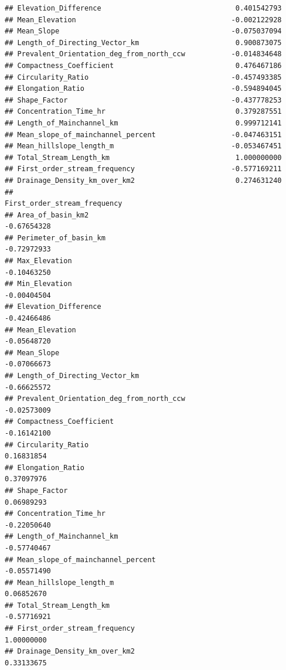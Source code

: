 \documentclass[11pt,]{article}
\begin{document}
\begin{verbatim}
## Elevation_Difference                                0.401542793
## Mean_Elevation                                     -0.002122928
## Mean_Slope                                         -0.075037094
## Length_of_Directing_Vector_km                       0.900873075
## Prevalent_Orientation_deg_from_north_ccw           -0.014834648
## Compactness_Coefficient                             0.476467186
## Circularity_Ratio                                  -0.457493385
## Elongation_Ratio                                   -0.594894045
## Shape_Factor                                       -0.437778253
## Concentration_Time_hr                               0.379287551
## Length_of_Mainchannel_km                            0.999712141
## Mean_slope_of_mainchannel_percent                  -0.047463151
## Mean_hillslope_length_m                            -0.053467451
## Total_Stream_Length_km                              1.000000000
## First_order_stream_frequency                       -0.577169211
## Drainage_Density_km_over_km2                        0.274631240
##                                          First_order_stream_frequency
## Area_of_basin_km2                                         -0.67654328
## Perimeter_of_basin_km                                     -0.72972933
## Max_Elevation                                             -0.10463250
## Min_Elevation                                             -0.00404504
## Elevation_Difference                                      -0.42466486
## Mean_Elevation                                            -0.05648720
## Mean_Slope                                                -0.07066673
## Length_of_Directing_Vector_km                             -0.66625572
## Prevalent_Orientation_deg_from_north_ccw                  -0.02573009
## Compactness_Coefficient                                   -0.16142100
## Circularity_Ratio                                          0.16831854
## Elongation_Ratio                                           0.37097976
## Shape_Factor                                               0.06989293
## Concentration_Time_hr                                     -0.22050640
## Length_of_Mainchannel_km                                  -0.57740467
## Mean_slope_of_mainchannel_percent                         -0.05571490
## Mean_hillslope_length_m                                    0.06852670
## Total_Stream_Length_km                                    -0.57716921
## First_order_stream_frequency                               1.00000000
## Drainage_Density_km_over_km2                               0.33133675

\end{verbatim}
\end{document}
